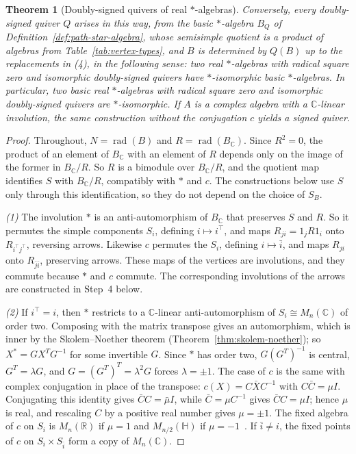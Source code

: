 \documentclass[12pt, a4paper]{report}
\theoremstyle{plain}
\newtheorem{theorem}{Theorem}[chapter]
\theoremstyle{definition}
\theoremstyle{remark}
\theoremstyle{plain}
\newcommand{\rad}[0]{\operatorname{rad}} %
\newcommand{\RR}{\mathbb{R}}
\newcommand{\CC}{\mathbb{C}}
\newcommand{\HH}{\mathbb{H}}
\begin{document}
\begin{theorem}[Doubly-signed quivers of real $*$-algebras]
Conversely, every doubly-signed quiver $Q$ arises in this way, from the basic $*$-algebra $B_Q$ of Definition~\ref{def:path-star-algebra}, whose semisimple quotient is a product of algebras from Table~\ref{tab:vertex-types}, and $B$ is determined by $Q(B)$ up to the replacements in (4), in the following sense: two real $*$-algebras with radical square zero and isomorphic doubly-signed quivers have $*$-isomorphic basic $*$-algebras. In particular, two basic real $*$-algebras with radical square zero and isomorphic doubly-signed quivers are $*$-isomorphic. If $A$ is a complex algebra with a $\CC$-linear involution, the same construction without the conjugation $c$ yields a signed quiver.
\end{theorem}

\begin{proof}
Throughout, $N=\rad(B)$ and $R=\rad(B_\CC)$. Since $R^2=0$, the product of an element of $B_\CC$ with an element of $R$ depends only on the image of the former in $B_\CC/R$. So $R$ is a bimodule over $B_\CC/R$, and the quotient map identifies $S$ with $B_\CC/R$, compatibly with $*$ and $c$. The constructions below use $S$ only through this identification, so they do not depend on the choice of $S_B$.

\emph{(1)} The involution $*$ is an anti-automorphism of $B_\CC$ that preserves $S$ and $R$. So it permutes the simple components $S_i$, defining $i\mapsto i^{\top}$, and maps $R_{ji}=1_jR1_i$ onto $R_{i^{\top}j^{\top}}$, reversing arrows. Likewise $c$ permutes the $S_i$, defining $i\mapsto\bar i$, and maps $R_{ji}$ onto $R_{\bar j\bar i}$, preserving arrows. These maps of the vertices are involutions, and they commute because $*$ and $c$ commute. The corresponding involutions of the arrows are constructed in Step~4 below.

\emph{(2)} If $i^{\top}=i$, then $*$ restricts to a $\CC$-linear anti-automorphism of $S_i\cong M_n(\CC)$ of order two. Composing with the matrix transpose gives an automorphism, which is inner by the Skolem--Noether theorem (Theorem~\ref{thm:skolem-noether}); so $X^*=GX^TG^{-1}$ for some invertible $G$. Since $*$ has order two, $G(G^T)^{-1}$ is central, $G^T=\lambda G$, and $G=(G^T)^T=\lambda^2G$ forces $\lambda=\pm1$. The case of $c$ is the same with complex conjugation in place of the transpose: $c(X)=C\bar XC^{-1}$ with $C\bar C=\mu I$. Conjugating this identity gives $\bar CC=\bar\mu I$, while $\bar C=\mu C^{-1}$ gives $\bar CC=\mu I$; hence $\mu$ is real, and rescaling $C$ by a positive real number gives $\mu=\pm1$. The fixed algebra of $c$ on $S_i$ is $M_n(\RR)$ if $\mu=1$ and $M_{n/2}(\HH)$ if $\mu=-1$~\cite{KMRT1998}. If $\bar i\neq i$, the fixed points of $c$ on $S_i\times S_{\bar i}$ form a copy of $M_n(\CC)$.


\end{proof}
\end{document}
